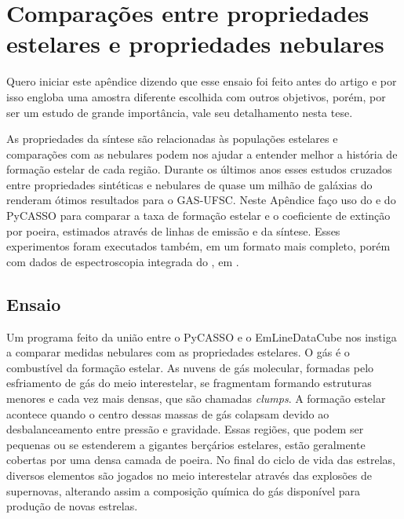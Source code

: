 

\chapter{Comparações entre propriedades estelares e propriedades nebulares}
\label{apendice:synvsneb}

Quero iniciar este apêndice dizendo que esse ensaio foi feito antes do artigo \citet{Lacerda.etal.2018} e por isso engloba uma amostra diferente escolhida com outros objetivos, porém, por ser um estudo de grande importância, vale seu detalhamento nesta tese.

As propriedades da síntese são relacionadas às populações estelares e comparações com as nebulares podem nos ajudar a entender melhor a história de formação estelar de cada região. Durante os últimos anos esses estudos cruzados entre propriedades sintéticas e nebulares de quase um milhão de galáxias do \SDSS renderam ótimos resultados para o GAS-UFSC. Neste Apêndice faço uso do \emldc e do PyCASSO para comparar a taxa de formação estelar e o coeficiente de extinção por poeira, estimados através de linhas de emissão e da síntese. Esses experimentos foram executados também, em um formato mais completo, porém com dados de espectroscopia integrada do \SDSS, em \citet{Mari2016}.


\section{Ensaio}
\label{apendice:synvsneb:ensaio}
Um programa feito da união entre o PyCASSO e o EmLineDataCube nos instiga a comparar medidas nebulares com as propriedades estelares. O gás é o combustível da formação estelar. As nuvens de gás molecular, formadas pelo esfriamento de gás do meio interestelar, se fragmentam formando estruturas menores e cada vez mais densas, que são chamadas {\em clumps}. A formação estelar acontece quando o centro dessas massas de gás colapsam devido ao desbalanceamento entre pressão e gravidade. Essas regiões, que podem ser pequenas ou se estenderem a gigantes berçários estelares, estão geralmente cobertas por uma densa camada de poeira. No final do ciclo de vida das estrelas, diversos elementos são jogados no meio interestelar através das explosões de supernovas, alterando assim a composição química do gás disponível para produção de novas estrelas.

